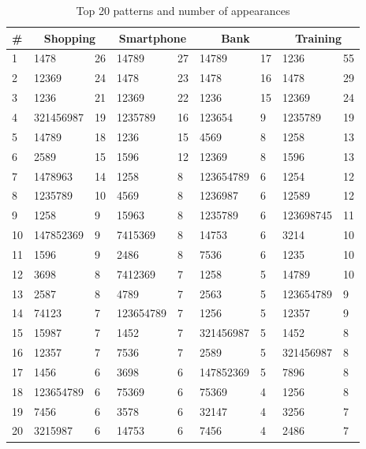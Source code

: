     \begin{table}[H]
	    \centering
	    \begin{tabular}{l || l l | l l | l l | l l }
	      \hline
	      {\bf \#} & \multicolumn{2}{c|}{\bf Shopping} & \multicolumn{2}{c|}{\bf Smartphone} & \multicolumn{2}{c|}{\bf Bank} & \multicolumn{2}{c}{\bf Training} \\ \hline
	      1  & 1478      & 26 & 14789      & 27 & 14789      & 17 & 1236       & 55 \\ 
	      2  & 12369     & 24 & 1478       & 23 & 1478       & 16 & 1478       & 29 \\
	      3  & 1236      & 21 & 12369      & 22 & 1236       & 15 & 12369      & 24 \\
	      4  & 321456987 & 19 & 1235789    & 16 & 123654     & 9  & 1235789    & 19 \\
	      5  & 14789     & 18 & 1236       & 15 & 4569       & 8  & 1258       & 13 \\
	      6  & 2589      & 15 & 1596       & 12 & 12369      & 8  & 1596       & 13 \\
	      7  & 1478963   & 14 & 1258       & 8  & 123654789  & 6  & 1254       & 12 \\
	      8  & 1235789   & 10 & 4569       & 8  & 1236987    & 6  & 12589      & 12 \\
	      9  & 1258      & 9  & 15963      & 8  & 1235789    & 6  & 123698745  & 11 \\
	      10 & 147852369 & 9  & 7415369    & 8  & 14753      & 6  & 3214       & 10 \\
	      11 & 1596      & 9  & 2486       & 8  & 7536       & 6  & 1235       & 10 \\
	      12 & 3698      & 8  & 7412369    & 7  & 1258       & 5  & 14789      & 10 \\
	      13 & 2587      & 8  & 4789       & 7  & 2563       & 5  & 123654789  & 9  \\
	      14 & 74123     & 7  & 123654789  & 7  & 1256       & 5  & 12357      & 9  \\
	      15 & 15987     & 7  & 1452       & 7  & 321456987  & 5  & 1452       & 8  \\
	      16 & 12357     & 7  & 7536       & 7  & 2589       & 5  & 321456987  & 8  \\
	      17 & 1456      & 6  & 3698       & 6  & 147852369  & 5  & 7896       & 8  \\
	      18 & 123654789 & 6  & 75369      & 6  & 75369      & 4  & 1256       & 8  \\
	      19 & 7456      & 6  & 3578       & 6  & 32147      & 4  & 3256       & 7  \\
	      20 & 3215987   & 6  & 14753      & 6  & 7456       & 4  & 2486       & 7  \\ \hline
	    \end{tabular}
	    \caption{Top 20 patterns and number of appearances}
	    \label{tab:top20}
  	\end{table}

